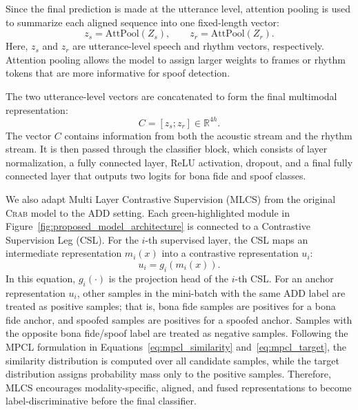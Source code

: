 \documentclass[12pt, a4paper, twocolumn]{article}
\newcommand{\crab}{\textsc{Crab}}
\begin{document}
Since the final prediction is made at the utterance level, attention pooling is
used to summarize each aligned sequence into one fixed-length vector:
\begin{equation}
z_s = \mathrm{AttPool}(Z_s), \qquad
z_r = \mathrm{AttPool}(Z_r).
\end{equation}
Here, \(z_s\) and \(z_r\) are utterance-level speech and rhythm vectors,
respectively. Attention pooling allows the model to assign larger weights to
frames or rhythm tokens that are more informative for spoof detection.

The two utterance-level vectors are concatenated to form the final multimodal
representation:
\begin{equation}
C = [z_s;z_r] \in \mathbb{R}^{4h}.
\end{equation}
The vector \(C\) contains information from both the acoustic stream and the
rhythm stream. It is then passed through the classifier block, which consists of
layer normalization, a fully connected layer, ReLU activation, dropout, and a
final fully connected layer that outputs two logits for bona fide and spoof
classes.

We also adapt Multi Layer Contrastive Supervision (MLCS) from the original
\crab{} model to the ADD setting. Each green-highlighted module in
Figure~\ref{fig:proposed_model_architecture} is connected to a Contrastive
Supervision Leg (CSL). For the
\(i\)-th supervised layer, the CSL maps an intermediate representation
\(m_i(x)\) into a contrastive representation \(u_i\):
\begin{equation}
u_i = g_i(m_i(x)).
\end{equation}
In this equation, \(g_i(\cdot)\) is the projection head of the \(i\)-th CSL\@.
For an anchor representation \(u_i\), other samples in the mini-batch with the
same ADD label are treated as positive samples; that is, bona fide samples are
positives for a bona fide anchor, and spoofed samples are positives for a spoofed
anchor. Samples with the opposite bona fide/spoof label are treated as negative
samples. Following the MPCL formulation in Equations~\eqref{eq:mpcl_similarity}
and~\eqref{eq:mpcl_target}, the similarity distribution is computed over all
candidate samples, while the target distribution assigns probability mass only
to the positive samples. Therefore, MLCS encourages modality-specific, aligned,
and fused representations to become label-discriminative before the final
classifier.
\end{document}
